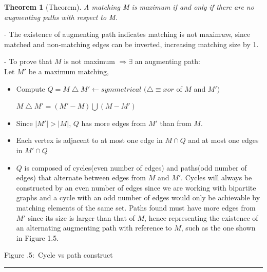 \documentclass[twoside]{article}
\newcounter{lecnum}
\newcommand{\fig}[3]{
      \vspace{#2}
      \begin{center}
      Figure \thelecnum.#1:~#3
      \end{center}
  }
\newtheorem{theorem}{Theorem}[lecnum]
\newenvironment{proof}{{\bf Proof:}}{\hfill\rule{2mm}{2mm}}
\begin{document}
\begin{theorem}[Theorem]
A matching M is maxim\emph{um} if and only if there are no augmenting paths with respect to M.
\end{theorem}
\begin{proof}

- The existence of augmenting path indicates matching is not maxim\emph{um}, since matched and non-matching edges can be inverted, increasing matching size by 1.

- To prove that $M$ is not maximum $\Rightarrow \exists$  an augmenting path:\\

Let $M'$ be a maximum matching,
\begin{itemize}
\item Compute $ Q = M \bigtriangleup M' \leftarrow symmetrical$ \quad \quad \quad $(\bigtriangleup \equiv xor$ of $M$ and $M')$

 \quad \quad \quad \quad $M \bigtriangleup M' = (M'-M) \bigcup(M-M')$
\item Since $|M'| > |M|$, $Q $ has more edges from $M'$ than from $M$.
\item Each vertex is adjacent to at most one edge in $M \cap Q$ and at most one edges in $M' \cap Q$
\item $Q$ is composed of cycles(even number of edges) and paths(odd number of edges) that alternate between edges from $M$ and $M'$. Cycles will always be constructed by an even number of edges since we are working with bipartite graphs and a cycle with an odd number of edges would only be achievable by matching elements of the same set. Paths found must have more edges from $M'$ since its size is larger than that of $M$, hence representing the existence of an alternating augmenting path with reference to $M$, such as the one shown in Figure 1.5.
\end{itemize}
\begin{center}
\end{center}
\fig{5}{0in}{Cycle vs path construct}

\end{proof}
\end{document}
